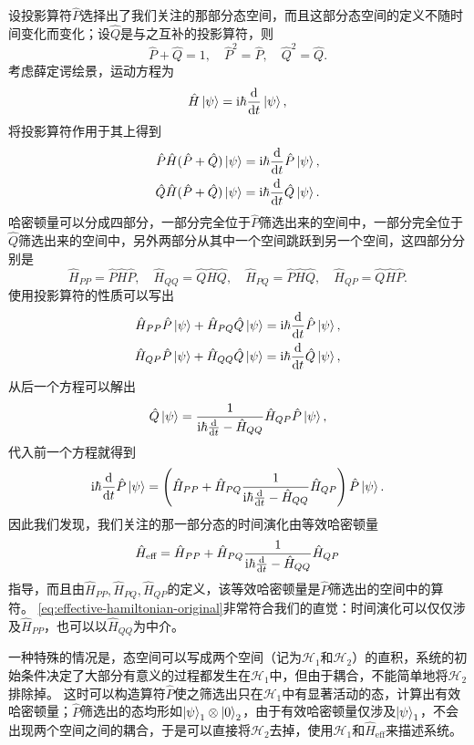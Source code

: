 \documentclass[UTF8, a4paper]{ctexart}
\newcommand*{\ii}{\mathrm{i}}
\begin{document}
设投影算符$\hat{P}$选择出了我们关注的那部分态空间，而且这部分态空间的定义不随时间变化而变化；设$\hat{Q}$是与之互补的投影算符，则
\[
    \hat{P} + \hat{Q} = 1, \quad \hat{P}^2 = \hat{P}, \quad \hat{Q}^2 = \hat{Q}.
\]
考虑薛定谔绘景，运动方程为
\[
    \hat{H} \ket{\psi} = \ii \hbar \dv{t} \ket{\psi},
\]
将投影算符作用于其上得到
\[
    \begin{aligned}
        \hat{P} \hat{H}(\hat{P}+\hat{Q}) \ket{\psi} = \ii \hbar \dv{t} \hat{P} \ket{\psi}, \\
        \hat{Q} \hat{H}(\hat{P}+\hat{Q}) \ket{\psi} = \ii \hbar \dv{t} \hat{Q} \ket{\psi}.
    \end{aligned}
\]
哈密顿量可以分成四部分，一部分完全位于$\hat{P}$筛选出来的空间中，一部分完全位于$\hat{Q}$筛选出来的空间中，另外两部分从其中一个空间跳跃到另一个空间，这四部分分别是
\[
    \hat{H}_{PP} = \hat{P} \hat{H} \hat{P}, \quad \hat{H}_{QQ} = \hat{Q} \hat{H} \hat{Q}, \quad \hat{H}_{PQ} = \hat{P} \hat{H} \hat{Q}, \quad \hat{H}_{QP} = \hat{Q} \hat{H} \hat{P}.
\]
使用投影算符的性质可以写出
\[
    \begin{aligned}
        \hat{H}_{PP} \hat{P} \ket{\psi} + \hat{H}_{PQ} \hat{Q} \ket{\psi} = \ii \hbar \dv{t} \hat{P} \ket{\psi}, \\
        \hat{H}_{QP} \hat{P} \ket{\psi} + \hat{H}_{QQ} \hat{Q} \ket{\psi} = \ii \hbar \dv{t} \hat{Q} \ket{\psi},
    \end{aligned}
\]
从后一个方程可以解出
\[
    \hat{Q} \ket{\psi} = \frac{1}{\ii \hbar \dv{t} - \hat{H}_{QQ}} \hat{H}_{QP} \hat{P} \ket{\psi},
\]
代入前一个方程就得到
\[
    \ii \hbar \dv{t} \hat{P} \ket{\psi} = \left(\hat{H}_{PP} + \hat{H}_{PQ} \frac{1}{\ii \hbar \dv{t} - \hat{H}_{QQ}} \hat{H}_{QP}\right) \hat{P} \ket{\psi}.
\]
因此我们发现，我们关注的那一部分态的时间演化由等效哈密顿量
\begin{equation}
    \hat{H}_\text{eff} = \hat{H}_{PP} + \hat{H}_{PQ} \frac{1}{\ii \hbar \dv{t} - \hat{H}_{QQ}} \hat{H}_{QP}
    \label{eq:effective-hamiltonian-original}
\end{equation}
指导，而且由$\hat{H}_{PP}, \hat{H}_{PQ}, \hat{H}_{QP}$的定义，该等效哈密顿量是$\hat{P}$筛选出的空间中的算符。
\eqref{eq:effective-hamiltonian-original}非常符合我们的直觉：时间演化可以仅仅涉及$\hat{H}_{PP}$，也可以以$\hat{H}_{QQ}$为中介。

一种特殊的情况是，态空间可以写成两个空间（记为$\mathcal{H}_1$和$\mathcal{H}_2$）的直积，系统的初始条件决定了大部分有意义的过程都发生在$\mathcal{H}_1$中，但由于耦合，不能简单地将$\mathcal{H}_2$排除掉。
这时可以构造算符$\hat{P}$使之筛选出只在$\mathcal{H}_1$中有显著活动的态，计算出有效哈密顿量；$\hat{P}$筛选出的态均形如$\ket{\psi}_1 \otimes \ket{0}_2$，由于有效哈密顿量仅涉及$\ket{\psi}_1$，不会出现两个空间之间的耦合，于是可以直接将$\mathcal{H}_2$去掉，使用$\mathcal{H}_1$和$\hat{H}_\text{eff}$来描述系统。
\end{document}
